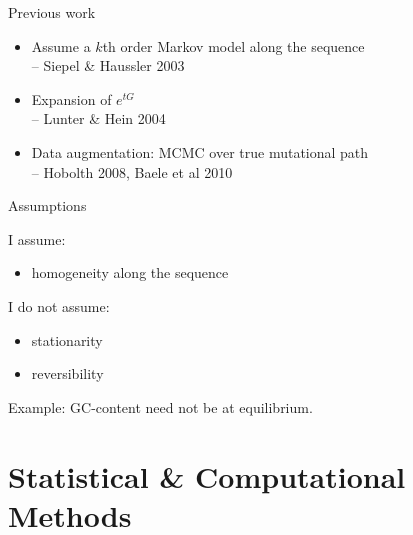 \documentclass[smaller]{beamer}
\begin{document}
\begin{frame}{Previous work}

  \begin{itemize}

    \item Assume a $k$th order Markov model along the sequence \\
      -- Siepel \& Haussler 2003

    \item Expansion of $e^{tG}$ \\
      -- Lunter \& Hein 2004 

    \item Data augmentation: MCMC over true mutational path \\
      -- Hobolth 2008, Baele et al 2010

  \end{itemize}

\end{frame}

\begin{frame}{Assumptions}

  I assume:
  \begin{itemize}

    \item homogeneity along the sequence

  \end{itemize}

  \vspace{2em}

  I do not assume:
  \begin{itemize}

    \item stationarity

    \item reversibility

  \end{itemize}

  \vspace{2em}

  Example: GC-content need not be at equilibrium.

\end{frame}


\section{Statistical \& Computational Methods}
\end{document}
